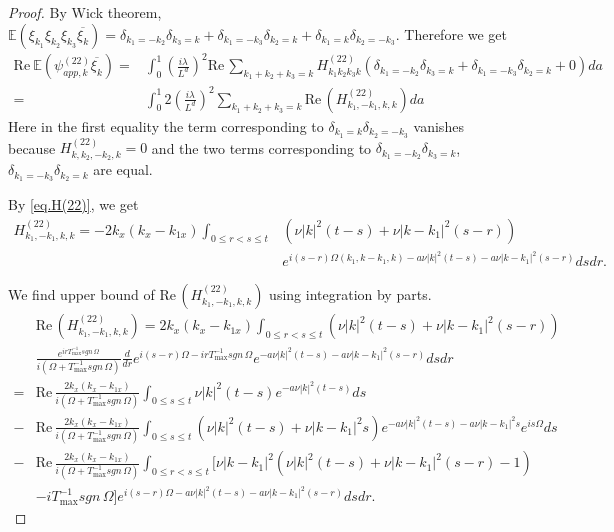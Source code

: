 \begin{proof}
By Wick theorem, $\mathbb E\left(\xi_{k_1} \xi_{k_2}\xi_{k_3}\overline{\xi_k}\right)=\delta_{k_1=-k_2}\delta_{k_3=k}+\delta_{k_1=-k_3}\delta_{k_2=k}+\delta_{k_1=k}\delta_{k_2=-k_3}$. Therefore we get 
\begin{equation}\label{eq.H(22)wick}
\begin{split}
    \text{Re}\  \mathbb E \left(\psi^{(22)}_{app,k}\overline{\xi_k}\right)=&\int^1_{0}\left(\frac{i\lambda}{L^{d}}\right)^2 \text{Re}\,\sum\limits_{k_1+k_2+k_3=k} H^{(22)}_{k_1k_2k_3k}(\delta_{k_1=-k_2}\delta_{k_3=k}+\delta_{k_1=-k_3}\delta_{k_2=k}+0) da
    \\
    =&\int^1_{0}2\left(\frac{i\lambda}{L^{d}}\right)^2 \sum\limits_{k_1+k_2+k_3=k} \text{Re}\,\left(H^{(22)}_{k_1,-k_1,k,k}\right) da
\end{split}
\end{equation}
Here in the first equality the term corresponding to $\delta_{k_1=k}\delta_{k_2=-k_3}$ vanishes because $H^{(22)}_{k,k_2,-k_2,k}=0$ and the two terms corresponding to $\delta_{k_1=-k_2}\delta_{k_3=k}$, $\delta_{k_1=-k_3}\delta_{k_2=k}$ are equal.

By \eqref{eq.H(22)}, we get
\begin{equation}
\begin{split}
    H^{(22)}_{k_1,-k_1,k,k}=-2k_{x}(k_{x}-k_{1x})\int_{0\le r<s\le t}&(\nu|k|^2(t-s)+\nu|k-k_1|^2(s-r))
    \\
    & e^{i (s-r)\Omega(k_1,k-k_1,k)- a\nu|k|^2(t-s)-a\nu|k-k_1|^2(s-r)}  dsdr.
\end{split}
\end{equation}

We find upper bound of $\text{Re}\,\left(H^{(22)}_{k_1,-k_1,k,k}\right)$ using integration by parts.
\begin{equation}\label{eq.ReH(22)bound}
\begin{split}
    &\text{Re}\,\left(H^{(22)}_{k_1,-k_1,k,k}\right)=2k_{x}(k_{x}-k_{1x})\int_{0\le r<s\le t}(\nu|k|^2(t-s)+\nu|k-k_1|^2(s-r))
    \\
    & \frac{e^{irT^{-1}_{\text{max}}sgn\, \Omega}}{i(\Omega+T^{-1}_{\text{max}}sgn\, \Omega)}\frac{d}{dr}e^{i (s-r)\Omega-irT^{-1}_{\text{max}}sgn\, \Omega}e^{- a\nu|k|^2(t-s)-a\nu|k-k_1|^2(s-r)}  dsdr
    \\
    =&\text{Re}\,\frac{2k_{x}(k_{x}-k_{1x})}{i(\Omega+T^{-1}_{\text{max}}sgn\, \Omega)}\int_{0\le s\le t}\nu|k|^2(t-s) e^{- a\nu|k|^2(t-s)}  ds
    \\
    -&\text{Re}\,\frac{2k_{x}(k_{x}-k_{1x})}{i(\Omega+T^{-1}_{\text{max}}sgn\, \Omega)}\int_{0\le s\le t}(\nu|k|^2(t-s)+\nu|k-k_1|^2s) e^{- a\nu|k|^2(t-s)-a\nu|k-k_1|^2s} e^{is\Omega} ds
    \\
    -&\text{Re}\,\frac{2k_{x}(k_{x}-k_{1x})}{i(\Omega+T^{-1}_{\text{max}}sgn\, \Omega)}\int_{0\le r<s\le t}\big[\nu|k-k_1|^2(\nu|k|^2(t-s)+\nu|k-k_1|^2(s-r)-1)
    \\
    & -iT^{-1}_{\text{max}}sgn\, \Omega\big]e^{i (s-r)\Omega- a\nu|k|^2(t-s)-a\nu|k-k_1|^2(s-r)}  dsdr.
\end{split}
\end{equation}


\end{proof}
